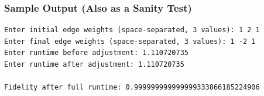 \documentclass[aps]{revtex4-2}
\begin{document}
\subsubsection{Sample Output (Also as a Sanity Test)}

\begin{verbatim}
Enter initial edge weights (space-separated, 3 values): 1 2 1
Enter final edge weights (space-separated, 3 values): 1 -2 1
Enter runtime before adjustment: 1.110720735
Enter runtime after adjustment: 1.110720735

Fidelity after full runtime: 0.999999999999999333866185224906
\end{verbatim}


\end{document}
